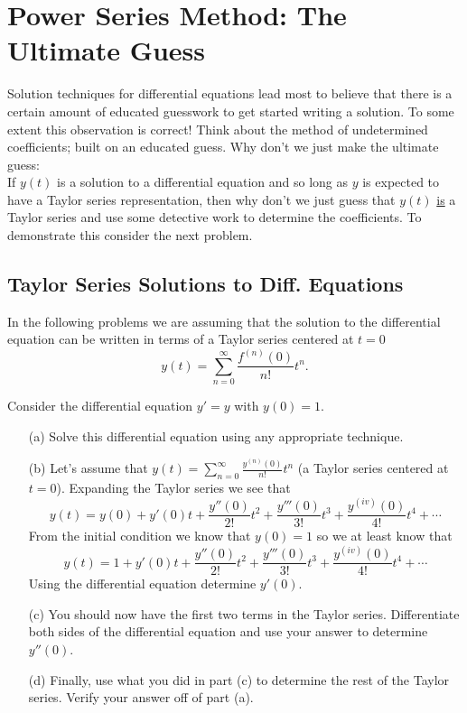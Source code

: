 \chapter{Power Series Method: The Ultimate Guess}
Solution techniques for differential equations lead most to believe that there is a
certain amount of educated guesswork to get started writing a solution.  To some extent
this observation is correct!  Think about the method of undetermined coefficients; built
on an educated guess.  Why don't we just make the ultimate guess: \\
If $y(t)$ is a solution to a differential equation and so long as $y$ is expected to have
a Taylor series representation, then why don't we just guess that $y(t)$ \underline{is} a Taylor
series and use some detective work to determine the coefficients.  To demonstrate this
consider the next problem.

\section{Taylor Series Solutions to Diff. Equations}\label{sec:Taylor_ODE}
In the following problems we are assuming that the solution to the differential equation
can be written in terms of a Taylor series centered at $t=0$
\[ y(t) = \sum_{n=0}^\infty \frac{f^{(n)}(0)}{n!}t^n. \]
\begin{problem}
    Consider the differential equation $y' = y$ with $y(0) = 1$.  
    \begin{enumerate}
        \item[(a)] Solve this differential equation using any appropriate technique.
        \item[(b)] Let's assume that $y(t) = \sum_{n=0}^\infty \frac{y^{(n)}(0)}{n!} t^n$ (a Taylor series
            centered at $t=0$).  Expanding the Taylor series we see that
            \[ y(t) = y(0) + y'(0)t + \frac{y''(0)}{2!}t^2 + \frac{y'''(0)}{3!}t^3 +
            \frac{y^{(iv)}(0)}{4!}t^4 + \cdots \]
            From the initial condition we know that $y(0) = 1$ so we at least know that 
            \[ y(t) = 1 + y'(0)t + \frac{y''(0)}{2!}t^2 + \frac{y'''(0)}{3!}t^3 +
            \frac{y^{(iv)}(0)}{4!}t^4 + \cdots \]
            Using the differential equation determine $y'(0)$.
        \item[(c)] You should now have the first two terms in the Taylor series.
            Differentiate both sides of the differential equation and use your answer to
            determine $y''(0)$.
        \item[(d)] Finally, use what you did in part (c) to determine the rest of the
            Taylor series.  Verify your answer off of part (a).
            \solution{
                \[ y(t) = 1 + t + \frac{t^2}{2} + \frac{t^3}{3!} + \cdots = e^t. \]
            }
    \end{enumerate}
\end{problem}

